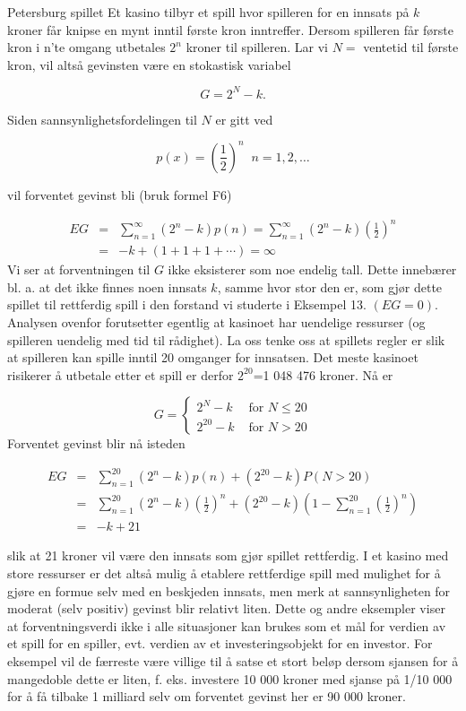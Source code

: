 \begin{eksempel}{Petersburg spillet}
Et kasino tilbyr et spill hvor spilleren for en innsats på $k$
kroner får knipse en mynt inntil første kron inntreffer. Dersom
spilleren får første kron i n'te omgang utbetales $2^n$ kroner
til spilleren.  Lar vi $N=$ ventetid til
første kron, vil altså gevinsten være en stokastisk variabel

\[   G=2^N-k. \]

\noindent Siden sannsynlighetsfordelingen til $N$ er gitt ved

\[ p(x)={(\frac{1}{2})}^n \; \; n=1,2, \ldots \]

\noindent vil forventet gevinst bli (bruk formel F6)

\begin{eqnarray*}
 EG&=& \sum_{n=1}^{\infty}(2^n-k)p(n)= 
         \sum_{n=1}^{\infty}(2^n-k){(\frac{1}{2})}^n \\
   &=&-k+(1+1+1+ \cdots )= \infty
\end{eqnarray*}
\noindent Vi ser at forventningen til $G$ ikke eksisterer som noe endelig
tall. Dette innebærer bl. a. at det ikke finnes noen innsats $k$,
samme hvor stor den er, som gjør dette spillet til rettferdig
spill i den forstand vi studerte i Eksempel 13. $(EG=0)$.
Analysen ovenfor forutsetter egentlig at kasinoet har uendelige
ressurser (og spilleren uendelig med tid til rådighet). La oss
tenke oss at spillets regler er slik at spilleren kan spille
inntil 20 omganger for innsatsen. Det meste kasinoet risikerer å
utbetale etter et spill er derfor $2^{20}$=1 048 476 kroner. Nå
er

\[ G=\left\{ \begin{array}{ll}
              2^N-k & \mbox{\ for \ } N \leq 20 \\
              2^{20}-k & \mbox{\ for \ } N > 20 
             \end{array} \right. \]
\noindent Forventet gevinst blir nå isteden

\begin{eqnarray*}
 EG&=& \sum_{n=1}^{20}(2^n-k)p(n)+(2^{20}-k)P(N>20) \\ 
   &=& \sum_{n=1}^{20}(2^n-k){(\frac{1}{2})}^n+
               (2^{20}-k)(1-\sum_{n=1}^{20}{(\frac{1}{2})}^n) \\
   &=&-k+21  
\end{eqnarray*}

\noindent slik at 21 kroner vil være den innsats som gjør spillet
rettferdig. I et kasino med store ressurser er det altså
mulig å etablere rettferdige spill med mulighet for å gjøre en
formue selv med en beskjeden innsats, men merk at sannsynligheten
for moderat (selv positiv) gevinst blir relativt liten. Dette og
andre eksempler viser at forventningsverdi ikke i alle
situasjoner kan brukes som et mål for verdien av et spill for en
spiller, evt. verdien av et investeringsobjekt for en investor.
For eksempel vil de færreste være villige til å satse
et stort beløp dersom sjansen for å mangedoble dette er liten,
f. eks. investere 10 000 kroner med sjanse på 1/10 000 for å få
tilbake 1 milliard selv om forventet gevinst her er 90 000
kroner.
\end{eksempel}
\normalsize

